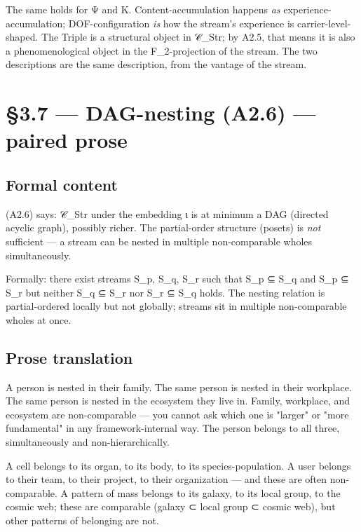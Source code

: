 \documentclass[11pt, openany]{book}
\newcommand{\sectionbreak}{\clearpage}
\begin{document}
The same holds for Ψ and Κ. Content-accumulation happens \textit{as} experience-accumulation; DOF-configuration \textit{is} how the stream's experience is carrier-level-shaped. The Triple is a structural object in 𝒞\_\allowbreak{}Str; by A2.5, that means it is also a phenomenological object in the F\_\allowbreak{}2-projection of the stream. The two descriptions are the same description, from the vantage of the stream.

\sectionbreak

\section{§3.7 --- DAG-nesting (A2.6) --- paired prose}

\subsection{Formal content}

(A2.6) says: 𝒞\_\allowbreak{}Str under the embedding ι is at minimum a DAG (directed acyclic graph), possibly richer. The partial-order structure (posets) is \textit{not} sufficient --- a stream can be nested in multiple non-comparable wholes simultaneously.

Formally: there exist streams S\_\allowbreak{}p, S\_\allowbreak{}q, S\_\allowbreak{}r such that S\_\allowbreak{}p ⊆ S\_\allowbreak{}q and S\_\allowbreak{}p ⊆ S\_\allowbreak{}r but neither S\_\allowbreak{}q ⊆ S\_\allowbreak{}r nor S\_\allowbreak{}r ⊆ S\_\allowbreak{}q holds. The nesting relation is partial-ordered locally but not globally; streams sit in multiple non-comparable wholes at once.

\subsection{Prose translation}

A person is nested in their family. The same person is nested in their workplace. The same person is nested in the ecosystem they live in. Family, workplace, and ecosystem are non-comparable --- you cannot ask which one is "larger" or "more fundamental" in any framework-internal way. The person belongs to all three, simultaneously and non-hierarchically.

A cell belongs to its organ, to its body, to its species-population. A user belongs to their team, to their project, to their organization --- and these are often non-comparable. A pattern of mass belongs to its galaxy, to its local group, to the cosmic web; these are comparable (galaxy ⊂ local group ⊂ cosmic web), but other patterns of belonging are not.
\end{document}
